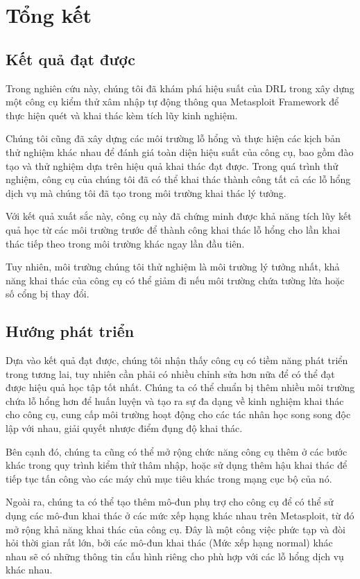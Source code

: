 \chapter{Tổng kết}
\label{chapter5}
\section{Kết quả đạt được}
Trong nghiên cứu này, chúng tôi đã khám phá hiệu suất của DRL trong xây dựng một công cụ kiểm thử xâm nhập tự động thông qua Metasploit Framework để thực hiện quét và khai thác kèm tích lũy kinh nghiệm. 

Chúng tôi cũng đã xây dựng các môi trường lỗ hổng và thực hiện các kịch bản thử nghiệm khác nhau để đánh giá toàn diện hiệu suất của công cụ, bao gồm đào tạo và thử nghiệm dựa trên hiệu quả khai thác đạt được. Trong quá trình thử nghiệm, công cụ của chúng tôi đã có thể khai thác thành công tất cả các lỗ hổng dịch vụ mà chúng tôi đã tạo trong môi trường khai thác lý tưởng. 

Với kết quả xuất sắc này, công cụ này đã chứng minh được khả năng tích lũy kết quả học từ các môi trường trước để thành công khai thác lỗ hổng cho lần khai thác tiếp theo trong môi trường khác ngay lần đầu tiên. 

Tuy nhiên, môi trường chúng tôi thử nghiệm là môi trường lý tưởng nhất, khả năng khai thác của công cụ có thể giảm đi nếu môi trường chứa tường lửa hoặc số cổng bị thay đổi. 

\section{Hướng phát triển}
Dựa vào kết quả đạt được, chúng tôi nhận thấy công cụ có tiềm năng phát triển trong tương lai, tuy nhiên cần phải có nhiều chỉnh sửa hơn nữa để có thể đạt được  hiệu quả học tập tốt nhất. Chúng ta có thể chuẩn bị thêm nhiều môi trường chứa lỗ hổng hơn để huấn luyện và tạo ra sự đa dạng về kinh nghiệm khai thác cho công cụ, cung cấp môi trường hoạt động cho các tác nhân học song song độc lập với nhau, giải quyết nhược điểm đụng độ khai thác. 

Bên cạnh đó, chúng ta cũng có thể mở rộng chức năng công cụ thêm ở các bước khác trong quy trình kiểm thử thâm nhập, hoặc sử dụng thêm hậu khai thác để tiếp tục tấn công vào các máy chủ mục tiêu khác trong mạng cục bộ của nó. 

Ngoài ra, chúng ta có thể tạo thêm mô-đun phụ trợ cho công cụ để có thể sử dụng các mô-đun khai thác ở các mức xếp hạng khác nhau trên Metasploit, từ đó mở rộng khả năng khai thác của công cụ. Đây là một công việc phức tạp và đòi hỏi thời gian rất lớn, bởi các mô-đun khai thác (Mức xếp hạng normal) khác nhau sẽ có những thông tin cấu hình riêng cho phù hợp với các lỗ hổng dịch vụ khác nhau.